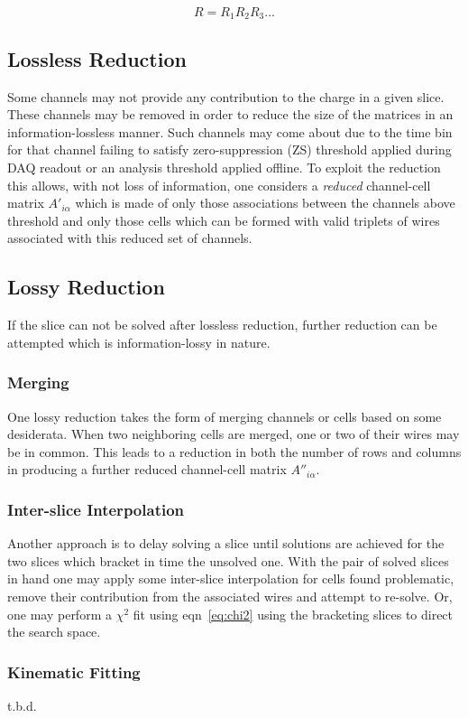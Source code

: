 \documentclass[letter]{article}
\begin{document}
\begin{equation}
  \label{eq:multipleR}
  R = R_1 R_2 R_3 ...
\end{equation}

\subsection{Lossless Reduction}

Some channels may not provide any contribution to the charge in a
given slice.
These channels may be removed in order to reduce the size of the
matrices in an information-lossless manner.
Such channels may come about due to the time bin for that channel failing to
satisfy zero-suppression (ZS) threshold applied during DAQ readout or
an analysis threshold applied offline.
To exploit the reduction this allows, with not loss of information,
one considers a \textit{reduced} channel-cell matrix
$A'_{i\alpha}$ which is made of only those associations
between the channels above threshold and only those cells which can be
formed with valid triplets of wires associated with this reduced set of
channels.

\subsection{Lossy Reduction}

If the slice can not be solved after lossless reduction, further
reduction can be attempted which is information-lossy in nature.


\subsubsection{Merging}

One lossy reduction takes the form of merging channels or cells based on
some desiderata.
When two neighboring cells are merged, one or two of their wires may be in common.
This leads to a reduction in both the number of rows and columns in
producing a further reduced channel-cell matrix $A''_{i\alpha}$.

\subsubsection{Inter-slice Interpolation}

Another approach is to delay solving a slice until solutions are
achieved for the two slices which
bracket in time the unsolved one.
With the pair of solved slices in hand one may apply some inter-slice
interpolation for cells found problematic, remove their contribution
from the associated wires and attempt to re-solve.
Or, one may perform a $\chi^2$ fit using eqn~\ref{eq:chi2} using the
bracketing slices to direct the search space. 

\subsubsection{Kinematic Fitting}
t.b.d.
\end{document}
